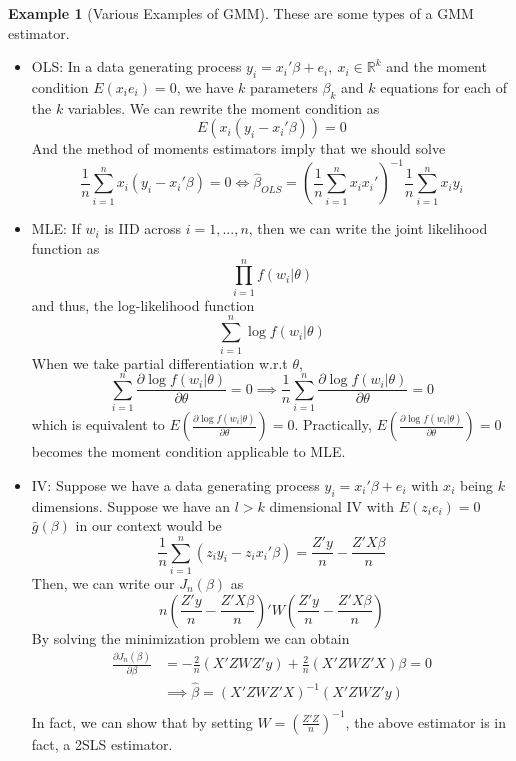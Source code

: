 \documentclass[12pt]{article}
\theoremstyle{definition}
\theoremstyle{property}
\theoremstyle{assumption}
\theoremstyle{example}
\newtheorem{example}{Example}[section]
\theoremstyle{comment}
\begin{document}
\begin{mdframed}[backgroundcolor=yellow!5] 
\begin{example}[Various Examples of GMM] These are some types of a GMM estimator. 
\begin{itemize}
\item OLS: In a data generating process $y_i = x_i'\beta+e_i,\ x_i\in\mathbb{R}^k$ and the moment condition $E(x_ie_i)=0$, we have $k$ parameters $\beta_k$  and $k$ equations for each of the $k$ variables. We can rewrite the moment condition as
\[
E(x_i(y_i-x_i'\beta))=0
\]
And the method of moments estimators imply that we should solve 
\[
\frac{1}{n}\sum_{i=1}^nx_i(y_i-x_i'\beta)=0\iff \hat{\beta}_{OLS}=\left(\frac{1}{n}\sum_{i=1}^n x_ix_i'\right)^{-1}\frac{1}{n}\sum_{i=1}^n x_iy_i
\]
\item MLE: If $w_i$ is IID across $i=1,...,n$, then we can write the joint likelihood function as
\[
\prod_{i=1}^nf(w_i|\theta)
\]
and thus, the log-likelihood function
\[
\sum_{i=1}^n \log f(w_i|\theta)
\]
When we take partial differentiation w.r.t $\theta$, 
\[
\sum_{i=1}^n \frac{\partial \log f(w_i|\theta)}{\partial \theta}=0 \implies \frac{1}{n}\sum_{i=1}^n \frac{\partial \log f(w_i|\theta)}{\partial \theta}=0 
\]
which is equivalent to $E\left(\frac{\partial \log f(w_i|\theta)}{\partial \theta}\right)=0$. Practically, $E\left(\frac{\partial \log f(w_i|\theta)}{\partial \theta}\right)=0$ becomes the moment condition applicable to MLE.
\item IV: Suppose we have a data generating process $y_i=x_i'\beta+e_i$ with $x_i$ being $k$ dimensions.  Suppose we have an $l>k$ dimensional IV with $E(z_ie_i)=0$  $\bar{g}(\beta)$ in our context would be
\[
\frac{1}{n}\sum_{i=1}^n(z_iy_i-z_ix_i'\beta) = \frac{Z'y}{n}-\frac{Z'X\beta}{n}
\]
Then, we can write our $J_n(\beta)$ as
\[
n\left(\frac{Z'y}{n}-\frac{Z'X\beta}{n} \right)'W\left(\frac{Z'y}{n}-\frac{Z'X\beta}{n} \right)
\]
By solving the minimization problem we can obtain
\[
\begin{aligned}
\frac{\partial J_n(\beta)}{\partial \beta}&=-\frac{2}{n}(X'ZWZ'y)+\frac{2}{n}(X'ZWZ'X)\beta=0\\
&\implies\hat{\beta}=(X'ZWZ'X)^{-1}(X'ZWZ'y)\\
\end{aligned}
\]
In fact, we can show that by setting $W=\left(\frac{Z'Z}{n}\right)^{-1}$, the above estimator is in fact, a 2SLS estimator. 
\end{itemize}
\end{example}
\end{mdframed}
\end{document}
